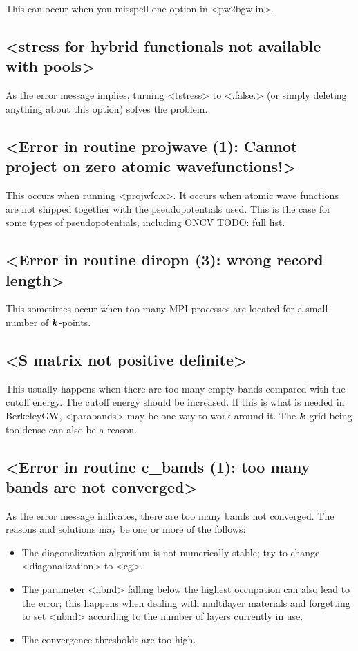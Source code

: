 \documentclass[hyperref, a4paper, 12pt]{report}
\def\texttt#1{<#1>}%
\newcommand{\shortcode}[1]{\texttt{#1}}
\begin{document}
This can occur when you misspell one option in \shortcode{pw2bgw.in}.

\subsection{\shortcode{stress for hybrid functionals not available with pools}}

As the error message implies,  
turning \shortcode{tstress} to \shortcode{.false.} (or simply deleting anything about this option)
solves the problem.

\subsection{\shortcode{Error in routine projwave (1): Cannot project on zero atomic wavefunctions!}}

This occurs when running \shortcode{projwfc.x}. 
It occurs when atomic wave functions are not 
shipped together with the pseudopotentials used. 
This is the case for some types of pseudopotentials, 
including ONCV TODO: full list.

\subsection{\shortcode{Error in routine diropn (3): wrong record length}}

This sometimes occur when too many MPI processes are located 
for a small number of $\vb*{k}$-points.

\subsection{\shortcode{S matrix not positive definite}}

This usually happens when there are too many empty bands
compared with the cutoff energy.
The cutoff energy should be increased.
If this is what is needed in BerkeleyGW, 
\shortcode{parabands} may be one way to work around it.
The $\vb*{k}$-grid being too dense can also be a reason.

\subsection{\shortcode{Error in routine c_bands (1): too many bands are not converged}}

As the error message indicates, there are too many bands not converged.
The reasons and solutions may be one or more of the follows:
\begin{itemize}
    \item The diagonalization algorithm is not numerically stable;
        try to change \shortcode{diagonalization} to \shortcode{cg}.
    \item The parameter \shortcode{nbnd} 
        falling below the highest occupation can also lead to the error; 
        this happens when dealing with multilayer materials 
        and forgetting to set \shortcode{nbnd} 
        according to the number of layers currently in use.
    \item The convergence thresholds are too high.
\end{itemize}
\end{document}

